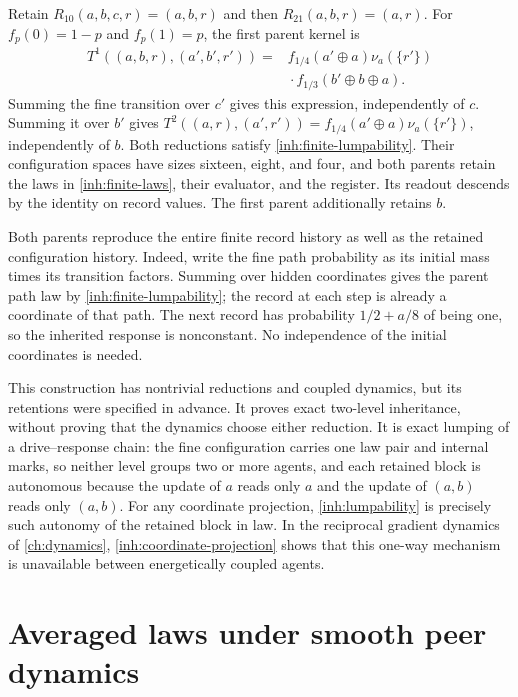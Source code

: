 Retain $R_{10}(a,b,c,r)=(a,b,r)$ and then $R_{21}(a,b,r)=(a,r)$. For
$f_p(0)=1-p$ and $f_p(1)=p$, the first parent kernel is
\begin{equation}
 \begin{aligned}
 T^1((a,b,r),(a',b',r'))
 ={}&f_{1/4}(a'\mathbin\oplus a)\nu_a(\{r'\})\\
 &{}\cdot f_{1/3}(b'\mathbin\oplus b\mathbin\oplus a).
 \end{aligned}
 \label{inh:first-finite-parent}
\end{equation}
Summing the fine transition over $c'$ gives this expression, independently
of $c$. Summing it over $b'$ gives
$T^2((a,r),(a',r'))=f_{1/4}(a'\mathbin\oplus a)\nu_a(\{r'\})$,
independently of $b$.
Both reductions satisfy \cref{inh:finite-lumpability}. Their configuration
spaces have sizes sixteen, eight, and four, and both parents retain the laws
in \cref{inh:finite-laws}, their evaluator, and the register. Its readout
descends by the identity on record values. The first parent additionally
retains $b$.

Both parents reproduce the entire finite record history as well as the
retained configuration history. Indeed, write the fine path probability
as its initial mass times its transition factors. Summing over hidden
coordinates gives the parent path law by \cref{inh:finite-lumpability};
the record at each step is already a coordinate of that path. The next
record has probability $1/2+a/8$ of being one, so the inherited response
is nonconstant. No independence of the initial coordinates is needed.

This construction has nontrivial reductions and coupled dynamics, but its
retentions were specified in advance. It proves exact two-level
inheritance, without proving that the dynamics choose either reduction.
It is exact lumping of a drive--response chain: the fine configuration
carries one law pair and internal marks, so neither level groups two or
more agents, and each retained block is autonomous because the update of
$a$ reads only $a$ and the update of $(a,b)$ reads only $(a,b)$. For any
coordinate projection, \cref{inh:lumpability} is precisely such autonomy
of the retained block in law. In the reciprocal gradient dynamics of
\cref{ch:dynamics}, \cref{inh:coordinate-projection} shows that this
one-way mechanism is unavailable between energetically coupled agents.

\section{Averaged laws under smooth peer dynamics}

